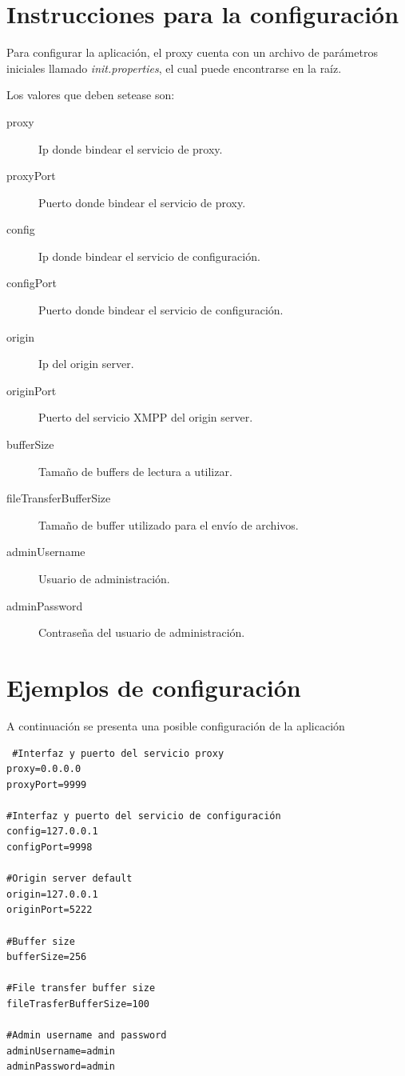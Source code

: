 \documentclass[a4paper,10pt]{article}
\begin{document}
\section{Instrucciones para la configuración}
Para configurar la aplicación, el proxy cuenta con un archivo de parámetros iniciales llamado \textit{init.properties}, el cual puede
encontrarse en la raíz.

Los valores que deben setease son:
\begin{description}
 \item [proxy] Ip donde bindear el servicio de proxy.
 \item [proxyPort] Puerto donde bindear el servicio de proxy.
 \item [config] Ip donde bindear el servicio de configuración.
 \item [configPort] Puerto donde bindear el servicio de configuración.
 \item [origin] Ip del origin server.
 \item [originPort] Puerto del servicio XMPP del origin server.
 \item [bufferSize] Tamaño de buffers de lectura a utilizar.
 \item [fileTransferBufferSize] Tamaño de buffer utilizado para el envío de archivos.
 \item [adminUsername] Usuario de administración.
 \item [adminPassword] Contraseña del usuario de administración.

\end{description}

\section{Ejemplos de configuración}
A continuación se presenta una posible configuración de la aplicación

\begin{verbatim}
 #Interfaz y puerto del servicio proxy
proxy=0.0.0.0
proxyPort=9999

#Interfaz y puerto del servicio de configuración
config=127.0.0.1
configPort=9998

#Origin server default
origin=127.0.0.1
originPort=5222

#Buffer size
bufferSize=256

#File transfer buffer size
fileTrasferBufferSize=100

#Admin username and password
adminUsername=admin
adminPassword=admin
\end{verbatim}
\end{document}

